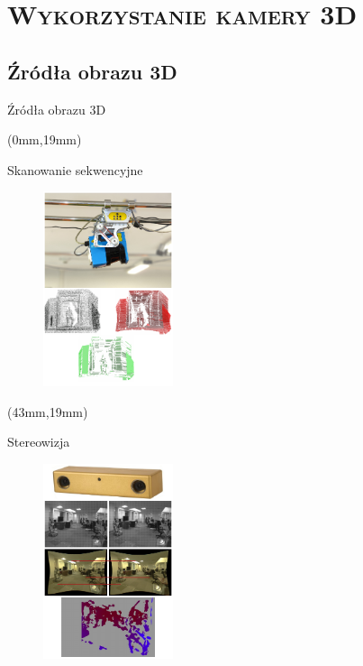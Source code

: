 \documentclass[xcolor=x11names,compress]{beamer}
\renewcommand{\(}{\begin{columns}}
\renewcommand{\)}{\end{columns}}
\newcommand{\<}[1]{\begin{column}{#1}}
\renewcommand{\>}{\end{column}}
\begin{document}
\section{\scshape Wykorzystanie kamery 3D}
\subsection{Źródła obrazu 3D}


\begin{frame}{Źródła obrazu 3D}


\begin{textblock*}{46mm}(0mm,19mm)%
    \begin{minipage}[l]{46mm}%
    \centering
	\alert{Skanowanie sekwencyjne}
	\begin{figure}[h!]
    \centering
    \includegraphics[width=3.8cm]{../Common/img/sick_vert}
    \end{figure}

    \end{minipage}
\end{textblock*}

\begin{textblock*}{40mm}(43mm,19mm)%
    \begin{minipage}[l]{40mm}%
    \centering
	\alert{Stereowizja}
	\begin{figure}[h!]
    \centering
    \includegraphics[width=3.8cm]{../Common/img/stereo_steps_vert}
    \end{figure}


\end{minipage}
\end{textblock*}
\end{frame}
\end{document}
